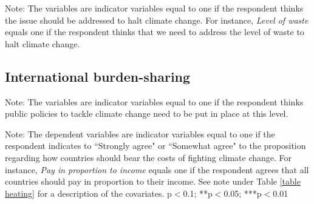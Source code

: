 \documentclass{article}
\begin{document}
\begin{landscape}
	\begin{table}[h!]
		\caption{Issues to address to halt CC}
		\begin{center}
			\scalebox{0.6}{}
		\end{center}
	{\footnotesize Note: The variables are indicator variables equal to one if the respondent thinks the issue should be addressed to halt climate change. For instance, \textit{Level of waste} equals one if the respondent thinks that we need to address the level of waste to halt climate change.}	
	\end{table}		
\end{landscape}

\clearpage
\subsection{International burden-sharing}

\begin{table}[h!]
	\caption{Best level to implement policies to tackle climate change}
	\begin{center}
		\scalebox{0.7}{}
	\end{center}
	{\footnotesize Note: The variables are indicator variables equal to one if the respondent thinks public policies to tackle climate change need to be put in place at this level.}
\end{table}	

\begin{landscape}
	\begin{table}[h!]
	\caption{Countries that should bear the costs}
	\begin{center}
		\scalebox{0.6}{}
	\end{center}
	{\footnotesize Note: The dependent variables are indicator variables equal to one if the respondent indicates to ``Strongly agree" or ``Somewhat agree" to the proposition regarding how countries should bear the costs of fighting climate change. For instance, \textit{Pay in proportion to income} equals one if the respondent agrees that all countries should pay in proportion to their income. See note under Table \ref{table heating} for a description of the covariates.
	\newline *p$<$0.1; **p$<$0.05; ***p$<$0.01}
\end{table}	
\end{landscape}
\end{document}
